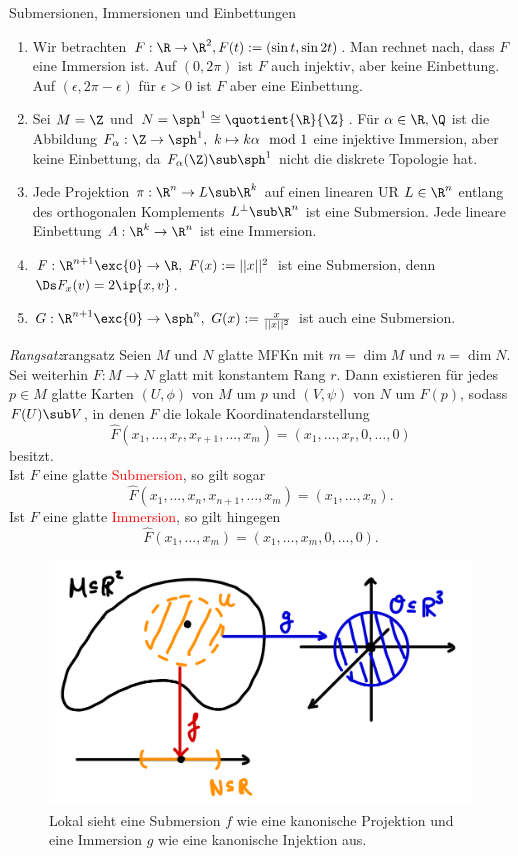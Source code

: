 \begin{beispiele} Submersionen, Immersionen und Einbettungen\\
\begin{enumerate}
\item Wir betrachten $F: \R \to \R^2, F(t):=(\sin t, \sin 2t)$. Man rechnet nach, dass $F$ eine Immersion ist. Auf $(0, 2\pi)$ ist $F$ auch injektiv, aber keine Einbettung. Auf $(\epsilon, 2\pi - \epsilon)$ für $\epsilon > 0$ ist $F$ aber eine Einbettung.
\item Sei $M=\Z$ und $N= \sph^1 \cong \quotient{\R}{\Z}$. Für $\alpha \in \R, \Q$ ist die Abbildung $F_\alpha: \Z \to \sph^1, \ k \mapsto k \alpha \mod 1$ eine injektive Immersion, aber keine Einbettung, da $F_\alpha(\Z) \sub \sph^1$ nicht die diskrete Topologie hat.
\item Jede Projektion $\pi: \R^n \to L \sub \R^k$ auf einen linearen UR $L \in \R^n$ entlang des orthogonalen Komplements $L^\perp \sub \R^n$ ist eine Submersion. Jede lineare Einbettung $A: \R^k \to \R^n$ ist eine Immersion.
\item $F: \R^{n+1} \exc \{0\}  \to \R, \ F(x) := ||x||^2$ ist eine Submersion, denn $\Ds F_x(v) = 2 \ip{x,v}$.
\item $G:  \R^{n+1} \exc \{0\} \to \sph^n, \ G(x):=\frac{x}{||x||^2}$ ist auch eine Submersion.
\end{enumerate}
\end{beispiele}
\begin{satz}{\textit{Rangsatz}}{rangsatz}
Seien $M$ und $N$ glatte MFKn mit $m = \dim M$ und $n = \dim N$. Sei weiterhin $F: M \to N$ glatt mit konstantem Rang $r$. Dann existieren für jedes $p \in M$ glatte Karten $(U,\phi)$ von $M$ um $p$ und $(V,\psi)$ von $N$ um $F(p)$, sodass $F(U) \sub V$, in denen $F$ die lokale Koordinatendarstellung 
\begin{equation}
\hat{F} (x_1, \dots, x_r, x_{r+1}, \dots, x_m) = (x_1, \dots, x_r, 0, \dots, 0)
\end{equation}
besitzt.\\
Ist $F$ eine glatte \textcolor{red}{Submersion}, so gilt sogar
\begin{equation}
\hat{F} (x_1, \dots, x_n, x_{n+1}, \dots, x_m) = (x_1, \dots, x_n).
\end{equation}
Ist $F$ eine glatte \textcolor{red}{Immersion}, so gilt hingegen
\begin{equation}
\hat{F} (x_1, \dots, x_m) = (x_1, \dots, x_m, 0, \dots, 0).
\end{equation}
\begin{figure}[H]
\label{fig:submersionimmersion}
\centering
\includegraphics[width=0.3\linewidth]{Bilder/submerimmer.png}
\caption{Lokal sieht eine Submersion $f$ wie eine kanonische Projektion und eine Immersion $g$ wie eine kanonische Injektion aus.}
\end{figure}
\end{satz}
